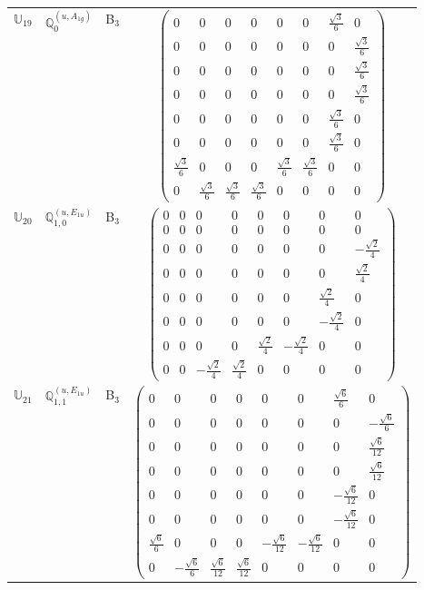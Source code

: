\documentclass[fleqn,10pt,landscape]{article}
\begin{document}
\begin{itemize}
\begin{center}
\begin{longtable}{c|c|c|c}
$ \mathbb{U}_{19} $ & $\mathbb{Q}_{0}^{(u,A_{1g})}$ & B$_{3}$ & $\begin{pmatrix} 0 & 0 & 0 & 0 & 0 & 0 & \frac{\sqrt{3}}{6} & 0 \\ 0 & 0 & 0 & 0 & 0 & 0 & 0 & \frac{\sqrt{3}}{6} \\ 0 & 0 & 0 & 0 & 0 & 0 & 0 & \frac{\sqrt{3}}{6} \\ 0 & 0 & 0 & 0 & 0 & 0 & 0 & \frac{\sqrt{3}}{6} \\ 0 & 0 & 0 & 0 & 0 & 0 & \frac{\sqrt{3}}{6} & 0 \\ 0 & 0 & 0 & 0 & 0 & 0 & \frac{\sqrt{3}}{6} & 0 \\ \frac{\sqrt{3}}{6} & 0 & 0 & 0 & \frac{\sqrt{3}}{6} & \frac{\sqrt{3}}{6} & 0 & 0 \\ 0 & \frac{\sqrt{3}}{6} & \frac{\sqrt{3}}{6} & \frac{\sqrt{3}}{6} & 0 & 0 & 0 & 0 \end{pmatrix}$ \\
$ \mathbb{U}_{20} $ & $\mathbb{Q}_{1,0}^{(u,E_{1u})}$ & B$_{3}$ & $\begin{pmatrix} 0 & 0 & 0 & 0 & 0 & 0 & 0 & 0 \\ 0 & 0 & 0 & 0 & 0 & 0 & 0 & 0 \\ 0 & 0 & 0 & 0 & 0 & 0 & 0 & - \frac{\sqrt{2}}{4} \\ 0 & 0 & 0 & 0 & 0 & 0 & 0 & \frac{\sqrt{2}}{4} \\ 0 & 0 & 0 & 0 & 0 & 0 & \frac{\sqrt{2}}{4} & 0 \\ 0 & 0 & 0 & 0 & 0 & 0 & - \frac{\sqrt{2}}{4} & 0 \\ 0 & 0 & 0 & 0 & \frac{\sqrt{2}}{4} & - \frac{\sqrt{2}}{4} & 0 & 0 \\ 0 & 0 & - \frac{\sqrt{2}}{4} & \frac{\sqrt{2}}{4} & 0 & 0 & 0 & 0 \end{pmatrix}$ \\
$ \mathbb{U}_{21} $ & $\mathbb{Q}_{1,1}^{(u,E_{1u})}$ & B$_{3}$ & $\begin{pmatrix} 0 & 0 & 0 & 0 & 0 & 0 & \frac{\sqrt{6}}{6} & 0 \\ 0 & 0 & 0 & 0 & 0 & 0 & 0 & - \frac{\sqrt{6}}{6} \\ 0 & 0 & 0 & 0 & 0 & 0 & 0 & \frac{\sqrt{6}}{12} \\ 0 & 0 & 0 & 0 & 0 & 0 & 0 & \frac{\sqrt{6}}{12} \\ 0 & 0 & 0 & 0 & 0 & 0 & - \frac{\sqrt{6}}{12} & 0 \\ 0 & 0 & 0 & 0 & 0 & 0 & - \frac{\sqrt{6}}{12} & 0 \\ \frac{\sqrt{6}}{6} & 0 & 0 & 0 & - \frac{\sqrt{6}}{12} & - \frac{\sqrt{6}}{12} & 0 & 0 \\ 0 & - \frac{\sqrt{6}}{6} & \frac{\sqrt{6}}{12} & \frac{\sqrt{6}}{12} & 0 & 0 & 0 & 0 \end{pmatrix}$ \\

\end{longtable}
\end{center}
\end{itemize}
\end{document}
